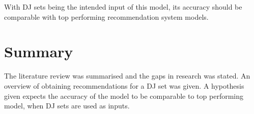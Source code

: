 With DJ sets being the intended input of this model, its accuracy should be comparable with top performing recommendation system models.

\section{Summary}
The literature review was summarised and the gaps in research was stated. An overview of obtaining recommendations for a DJ set was given. A hypothesis given expects the accuracy of the model to be comparable to top performing model, when DJ sets are used as inputs. 



